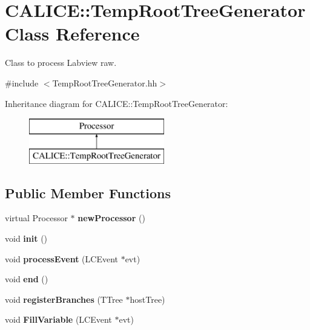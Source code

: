 \section{C\-A\-L\-I\-C\-E\-:\-:Temp\-Root\-Tree\-Generator Class Reference}
\label{classCALICE_1_1TempRootTreeGenerator}


Class to process Labview raw.  




{\ttfamily \#include $<$Temp\-Root\-Tree\-Generator.\-hh$>$}

Inheritance diagram for C\-A\-L\-I\-C\-E\-:\-:Temp\-Root\-Tree\-Generator\-:\begin{figure}[H]
\begin{center}
\leavevmode
\includegraphics[height=2.000000cm]{classCALICE_1_1TempRootTreeGenerator}
\end{center}
\end{figure}
\subsection*{Public Member Functions}
\begin{DoxyCompactItemize}
\item 
virtual Processor $\ast$ {\bfseries new\-Processor} ()\label{classCALICE_1_1TempRootTreeGenerator_a4683c88fa11fdadc38b174cbd78191df}

\item 
void {\bfseries init} ()\label{classCALICE_1_1TempRootTreeGenerator_a0a85ca935c8d4227cf78ff85745c801f}

\item 
void {\bfseries process\-Event} (L\-C\-Event $\ast$evt)\label{classCALICE_1_1TempRootTreeGenerator_affbf92f531b40ab279bec5764dd798b2}

\item 
void {\bfseries end} ()\label{classCALICE_1_1TempRootTreeGenerator_aebdde734f7d29091114a7c5da186e06f}

\item 
void {\bfseries register\-Branches} (T\-Tree $\ast$host\-Tree)\label{classCALICE_1_1TempRootTreeGenerator_a8c8c4c7c423b1aa404028e59960ba771}

\item 
void {\bfseries Fill\-Variable} (L\-C\-Event $\ast$evt)\label{classCALICE_1_1TempRootTreeGenerator_a3544386c3f78d68615da0c01f437e35e}

\end{DoxyCompactItemize}
